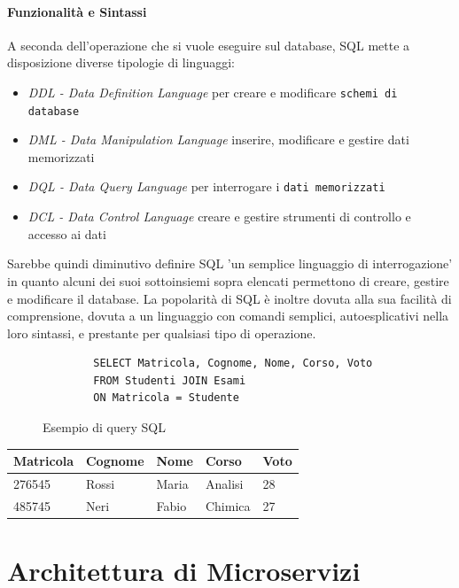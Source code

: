 \paragraph{Funzionalità e Sintassi} A seconda dell'operazione che si vuole eseguire sul database, SQL mette a disposizione diverse tipologie di linguaggi:
\begin{itemize}
    \item \textit{DDL - Data Definition Language} per creare e modificare \texttt{schemi di database}
    \item \textit{DML - Data Manipulation Language} inserire, modificare e gestire dati memorizzati
    \item \textit{DQL - Data Query Language} per interrogare i \texttt{dati memorizzati}
    \item \textit{DCL - Data Control Language} creare e gestire strumenti di controllo e accesso ai dati
\end{itemize}
Sarebbe quindi diminutivo definire SQL 'un semplice linguaggio di interrogazione' in quanto alcuni dei suoi sottoinsiemi sopra elencati permettono di creare, gestire e modificare il database. La popolarità di SQL è inoltre dovuta alla sua facilità di comprensione, dovuta a un linguaggio con comandi semplici, autoesplicativi nella loro sintassi, e prestante per qualsiasi tipo di operazione.
\begin{figure}[H]
    \centering
    \begin{verbatim}
        SELECT Matricola, Cognome, Nome, Corso, Voto 
        FROM Studenti JOIN Esami 
        ON Matricola = Studente
    \end{verbatim}
    \caption{Esempio di query SQL}
    \label{fig:sql-example}
\end{figure}
\begin{table}[H]
    \centering
    \begin{tabular}{ |p{2cm}||p{2cm}|p{2cm}|p{2cm}|p{2cm}|  }
        \hline
        Matricola & Cognome & Nome & Corso & Voto\\
        \hline
        276545 & Rossi & Maria & Analisi & 28\\
        485745 & Neri & Fabio & Chimica & 27\\
        \hline
    \end{tabular}
\end{table}


\section{Architettura di Microservizi}
